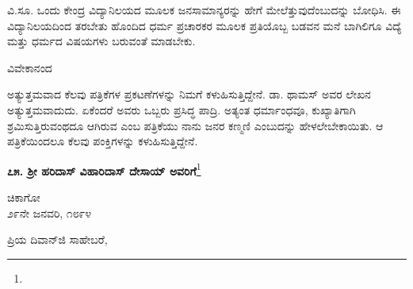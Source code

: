 ವಿ.ಸೂ. \enginline{-}ಒಂದು ಕೇಂದ್ರ ವಿದ್ಯಾನಿಲಯದ ಮೂಲಕ ಜನಸಾಮಾನ್ಯರನ್ನು ಹೇಗೆ ಮೇಲೆತ್ತುವುದೆಂಬುದನ್ನು ಬೋಧಿಸಿ. ಈ ವಿದ್ಯಾನಿಲಯದಿಂದ ತರಬೇತು ಹೊಂದಿದ ಧರ್ಮ ಪ್ರಚಾರಕರ ಮೂಲಕ ಪ್ರತಿಯೊಬ್ಬ ಬಡವನ ಮನೆ ಬಾಗಿಲಿಗೂ ವಿದ್ಯೆ ಮತ್ತು ಧರ್ಮದ ವಿಷಯಗಳು ಬರುವಂತೆ ಮಾಡಬೇಕು.
\vspace{-0.5cm}

\begin{flushright}
ವಿವೇಕಾನಂದ
\end{flushright}
\vspace{-0.2cm}

ಅತ್ಯುತ್ತಮವಾದ ಕೆಲವು ಪತ್ರಿಕೆಗಳ ಪ್ರಕಟಣೆಗಳನ್ನು ನಿಮಗೆ ಕಳುಹಿಸುತ್ತಿದ್ದೇನೆ. ಡಾ. ಥಾಮಸ್ ಅವರ ಲೇಖನ ಅತ್ಯುತ್ತಮವಾದುದು. ಏಕೆಂದರೆ ಅವರು ಒಬ್ಬರು ಪ್ರಸಿದ್ಧ ಪಾದ್ರಿ. ಅತ್ಯಂತ ಧರ್ಮಾಂಧವೂ, ಕುಖ್ಯಾತಿಗಾಗಿ ಶ್ರಮಿಸುತ್ತಿರುವಂಥದೂ ಆಗಿರುವ  ಎಂಬ ಪತ್ರಿಕೆಯು ನಾನು ಜನರ ಕಣ್ಮಣಿ ಎಂಬುದನ್ನು ಹೇಳಲೇಬೇಕಾಯಿತು. ಆ ಪತ್ರಿಕೆಯಿಂದಲೂ ಕೆಲವು ಪಂಕ್ತಿಗಳನ್ನು ಕಳುಹಿಸುತ್ತಿದ್ದೇನೆ.
\vspace{-0.2cm}

\begin{center}
\textbf{೭೫. ಶ‍್ರೀ ಹರಿದಾಸ್ ವಿಹಾರಿದಾಸ್ ದೇಸಾಯ್ ಅವರಿಗೆ}\footnote{}
\end{center}
\vspace{-0.6cm}

\begin{flushright}
ಚಿಕಾಗೋ\\೨೯ನೇ ಜನವರಿ, ೧೮೯೪
\end{flushright}

\vspace{-0.5cm}

\noindent
ಪ್ರಿಯ ದಿವಾನ್‌ಜಿ ಸಾಹೇಬರೆ,

